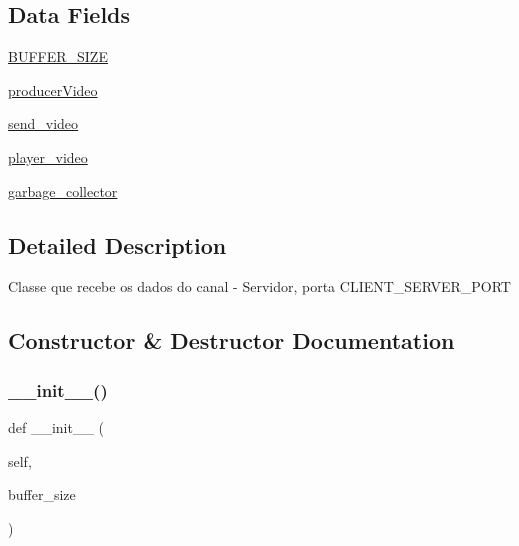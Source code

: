 \subsection*{Data Fields}
\begin{DoxyCompactItemize}
\item 
\hyperlink{class_client_1_1_server_receptor_aa300d171bb6f6573a2de65c5342303c9}{B\+U\+F\+F\+E\+R\+\_\+\+S\+I\+ZE}
\item 
\hyperlink{class_client_1_1_server_receptor_a8f5ab768a38f5129d304bd00bd90d1b7}{producer\+Video}
\item 
\hyperlink{class_client_1_1_server_receptor_ae1046c747241123fa0bf2e370a0bd52f}{send\+\_\+video}
\item 
\hyperlink{class_client_1_1_server_receptor_a265f7032febb91142eb6d7d9859eceb6}{player\+\_\+video}
\item 
\hyperlink{class_client_1_1_server_receptor_aa04cdc077d3e69c463bc713ce77f79ff}{garbage\+\_\+collector}
\end{DoxyCompactItemize}


\subsection{Detailed Description}
\begin{DoxyVerb}Classe que recebe os dados do canal - Servidor, porta CLIENT_SERVER_PORT\end{DoxyVerb}
 

\subsection{Constructor \& Destructor Documentation}
\mbox{\label{class_client_1_1_server_receptor_a8e9700e92cd4deb19f86ea6dc2f98cd3}} 
\subsubsection{\texorpdfstring{\+\_\+\+\_\+init\+\_\+\+\_\+()}{\_\_init\_\_()}}
{\footnotesize\ttfamily def \+\_\+\+\_\+init\+\_\+\+\_\+ (\begin{DoxyParamCaption}\item[{}]{self,  }\item[{}]{buffer\+\_\+size }\end{DoxyParamCaption})}



